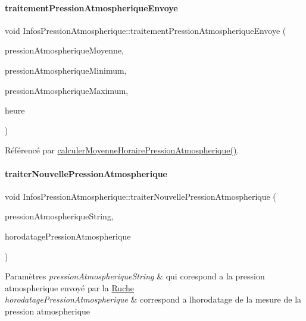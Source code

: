 \paragraph{\texorpdfstring{traitement\+Pression\+Atmospherique\+Envoye}{traitementPressionAtmospheriqueEnvoye}}
{\footnotesize\ttfamily void Infos\+Pression\+Atmospherique\+::traitement\+Pression\+Atmospherique\+Envoye (\begin{DoxyParamCaption}\item[{const double}]{pression\+Atmospherique\+Moyenne,  }\item[{const double}]{pression\+Atmospherique\+Minimum,  }\item[{const double}]{pression\+Atmospherique\+Maximum,  }\item[{int}]{heure }\end{DoxyParamCaption})\hspace{0.3cm}{\ttfamily [signal]}}



Référencé par \hyperlink{class_infos_pression_atmospherique_a287f1f24726218868c8531365c1a22ec}{calculer\+Moyenne\+Horaire\+Pression\+Atmospherique()}.

\mbox{\label{class_infos_pression_atmospherique_ab280f47f2a1376222a45fde8638489d2}} 
\paragraph{\texorpdfstring{traiter\+Nouvelle\+Pression\+Atmospherique}{traiterNouvellePressionAtmospherique}}
{\footnotesize\ttfamily void Infos\+Pression\+Atmospherique\+::traiter\+Nouvelle\+Pression\+Atmospherique (\begin{DoxyParamCaption}\item[{Q\+String}]{pression\+Atmospherique\+String,  }\item[{Q\+String}]{horodatage\+Pression\+Atmospherique }\end{DoxyParamCaption})\hspace{0.3cm}{\ttfamily [slot]}}


\begin{DoxyParams}{Paramètres}
{\em pression\+Atmospherique\+String} & qui corespond a la pression atmospherique envoyé par la \hyperlink{class_ruche}{Ruche} \\
\hline
{\em horodatage\+Pression\+Atmospherique} & correspond a l\textquotesingle{}horodatage de la mesure de la pression atmospherique \\
\hline
\end{DoxyParams}


